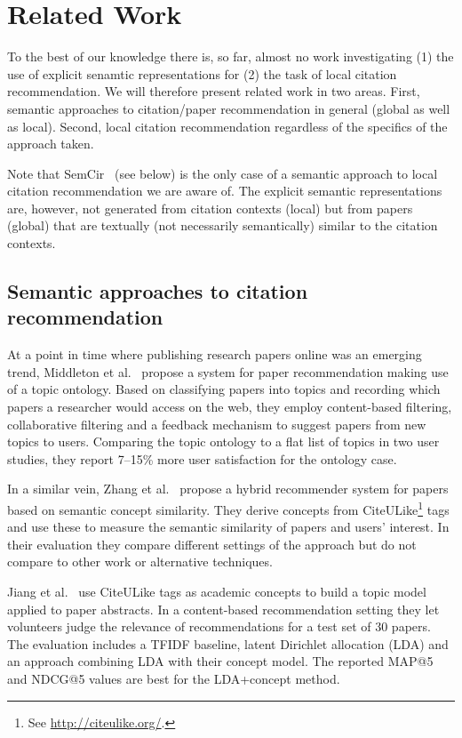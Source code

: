\chapter{Related Work}\label{chap:relatedwork}

To the best of our knowledge there is, so far, almost no work investigating (1) the use of explicit senamtic representations for (2) the task of local citation recommendation. We will therefore present related work in two areas. First, semantic approaches to citation/paper recommendation in general (global as well as local). Second, local citation recommendation regardless of the specifics of the approach taken.

Note that SemCir~\cite{Zarrinkalam2013} (see below) is the only case of a semantic approach to local citation recommendation we are aware of. The explicit semantic representations are, however, not generated from citation contexts (local) but from papers (global) that are textually (not necessarily semantically) similar to the citation contexts.

\section{Semantic approaches to citation recommendation}

At a point in time where publishing research papers online was an emerging trend, Middleton et al.~\cite{Middleton2001} propose a system for paper recommendation making use of a topic ontology. Based on classifying papers into topics and recording which papers a researcher would access on the web, they employ content-based filtering, collaborative filtering and a feedback mechanism to suggest papers from new topics to users. Comparing the topic ontology to a flat list of topics in two user studies, they report 7--15\% more user satisfaction for the ontology case.

In a similar vein, Zhang et al.~\cite{Zhang2008} propose a hybrid recommender system for papers based on semantic concept similarity. They derive concepts from CiteULike\footnote{See \url{http://citeulike.org/}.} tags and use these to measure the semantic similarity of papers and users' interest. In their evaluation they compare different settings of the approach but do not compare to other work or alternative techniques.

Jiang et al.~\cite{Jiang2012} use CiteULike tags as academic concepts to build a topic model applied to paper abstracts. In a content-based recommendation setting they let volunteers judge the relevance of recommendations for a test set of 30 papers. The evaluation includes a TFIDF baseline, latent Dirichlet allocation (LDA) and an approach combining LDA with their concept model. The reported MAP@5 and NDCG@5 values are best for the LDA+concept method.

